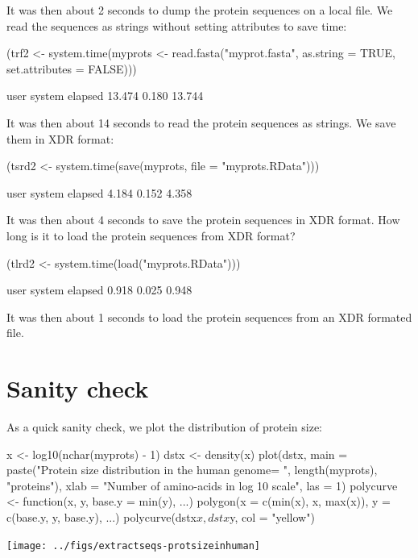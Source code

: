 \documentclass{article}
\begin{document}
It was then about 2 seconds
to dump the protein sequences on a local file. We read the sequences as strings
without setting attributes to save time:

\begin{Schunk}
\begin{Sinput}
 (trf2 <- system.time(myprots <- read.fasta("myprot.fasta", 
     as.string = TRUE, set.attributes = FALSE)))
\end{Sinput}
\begin{Soutput}
   user  system elapsed 
 13.474   0.180  13.744 
\end{Soutput}
\end{Schunk}

It was then about 14 seconds
to read the protein sequences as strings. We save them in XDR format:

\begin{Schunk}
\begin{Sinput}
 (tsrd2 <- system.time(save(myprots, file = "myprots.RData")))
\end{Sinput}
\begin{Soutput}
   user  system elapsed 
  4.184   0.152   4.358 
\end{Soutput}
\end{Schunk}

It was then about 4 seconds
to save the protein sequences in XDR format. How long is it to load the 
protein sequences from XDR format?

\begin{Schunk}
\begin{Sinput}
 (tlrd2 <- system.time(load("myprots.RData")))
\end{Sinput}
\begin{Soutput}
   user  system elapsed 
  0.918   0.025   0.948 
\end{Soutput}
\end{Schunk}

It was then about 1 seconds
to load the protein sequences from an XDR formated file.

\section{Sanity check}

As a quick sanity check, we plot the distribution of protein size:


\begin{Schunk}
\begin{Sinput}
 x <- log10(nchar(myprots) - 1)
 dstx <- density(x)
 plot(dstx, main = paste("Protein size distribution in the human genome\nn = ", 
     length(myprots), "proteins"), xlab = "Number of amino-acids in log 10 scale", 
     las = 1)
 polycurve <- function(x, y, base.y = min(y), ...) polygon(x = c(min(x), 
     x, max(x)), y = c(base.y, y, base.y), ...)
 polycurve(dstx$x, dstx$y, col = "yellow")
\end{Sinput}
\end{Schunk}
\texttt{[image: ../figs/extractseqs-protsizeinhuman]}
\end{document}

